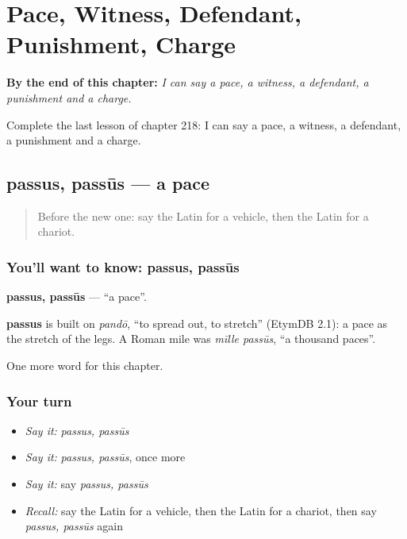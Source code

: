 
\chapter{Pace, Witness, Defendant, Punishment, Charge}
\label{ch:la-pace-witness-defendant-punishment-charge}

\begin{chapteropening}
\textbf{By the end of this chapter:} \emph{I can say a pace, a witness, a defendant, a punishment and a charge.}

Complete the last lesson of chapter 218: I can say a pace, a witness, a defendant, a punishment and a charge.
\end{chapteropening}

\section[passus, passūs]{passus, passūs — a pace}

\label{lesson:LA-C218-passus}



\begin{quote}
Before the new one: say the Latin for a vehicle, then the Latin for a chariot.
\end{quote}

\subsection*{You'll want to know: passus, passūs}
\textbf{passus, passūs} — \textquotedblleft{}a pace\textquotedblright{}.

\begin{cousinweb}
\textbf{passus} is built on \emph{pandō}, \textquotedblleft{}to spread out, to stretch\textquotedblright{} (EtymDB 2.1): a pace as the stretch of the legs. A Roman mile was \emph{mīlle passūs}, \textquotedblleft{}a thousand paces\textquotedblright{}.
\end{cousinweb}

\begin{grammarlens}[title={What you've built}]
One more word for this chapter.
\end{grammarlens}

\subsection*{Your turn}
\begin{itemize}
\raggedright
  \item \emph{Say it:} \emph{passus, passūs}
  \item \emph{Say it:} \emph{passus, passūs}, once more
  \item \emph{Say it:} say \emph{passus, passūs}
  \item \emph{Recall:} say the Latin for a vehicle, then the Latin for a chariot, then say \emph{passus, passūs} again
\end{itemize}


